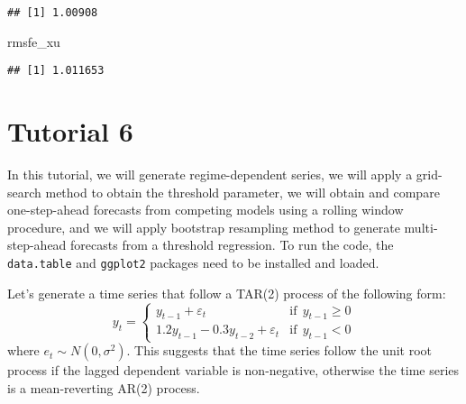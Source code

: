 \documentclass[
  oneside]{book}
\newenvironment{Shaded}{\begin{snugshade}}{\end{snugshade}}
\newcommand{\NormalTok}[1]{#1}
\begin{document}
\begin{verbatim}
## [1] 1.00908
\end{verbatim}

\begin{Shaded}
\begin{Highlighting}[]
\NormalTok{rmsfe\_xu}
\end{Highlighting}
\end{Shaded}

\begin{verbatim}
## [1] 1.011653
\end{verbatim}

\hypertarget{tutorial-6}{%
\chapter*{Tutorial 6}\label{tutorial-6}}

In this tutorial, we will generate regime-dependent series, we will apply a grid-search method to obtain the threshold parameter, we will obtain and compare one-step-ahead forecasts from competing models using a rolling window procedure, and we will apply bootstrap resampling method to generate multi-step-ahead forecasts from a threshold regression. To run the code, the \texttt{data.table} and \texttt{ggplot2} packages need to be installed and loaded.

Let's generate a time series that follow a TAR(2) process of the following form:
\[y_t = \left\{\begin{array}
{ll}
y_{t-1} + \varepsilon_t & \text{if}~~y_{t-1}\ge0 \\
1.2y_{t-1}-0.3y_{t-2} + \varepsilon_t & \text{if}~~y_{t-1} < 0
\end{array}\right.
\]
where \(e_{t} \sim N(0,\sigma^2)\). This suggests that the time series follow the unit root process if the lagged dependent variable is non-negative, otherwise the time series is a mean-reverting AR(2) process.
\end{document}
